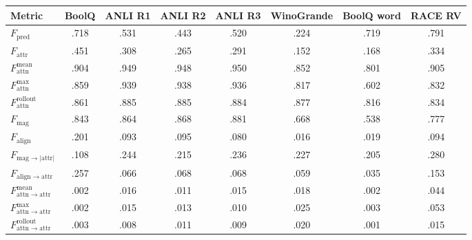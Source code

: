 \begin{tabular}{lccccccc}
\toprule
Metric & BoolQ & ANLI R1 & ANLI R2 & ANLI R3 & WinoGrande & BoolQ word & RACE RV \\
\midrule
$F_{\mathrm{pred}}$ & .718 & .531 & .443 & .520 & .224 & .719 & .791 \\
$F_{\mathrm{attr}}$ & .451 & .308 & .265 & .291 & .152 & .168 & .334 \\
\midrule
$F_{\mathrm{attn}}^{\mathrm{mean}}$ & .904 & .949 & .948 & .950 & .852 & .801 & .905 \\
$F_{\mathrm{attn}}^{\mathrm{max}}$ & .859 & .939 & .938 & .936 & .817 & .602 & .832 \\
$F_{\mathrm{attn}}^{\mathrm{rollout}}$ & .861 & .885 & .885 & .884 & .877 & .816 & .834 \\
$F_{\mathrm{mag}}$ & .843 & .864 & .868 & .881 & .668 & .538 & .777 \\
$F_{\mathrm{align}}$ & .201 & .093 & .095 & .080 & .016 & .019 & .094 \\
\midrule
$F_{\mathrm{mag}\to|\mathrm{attr}|}$ & .108 & .244 & .215 & .236 & .227 & .205 & .280 \\
$F_{\mathrm{align}\to\mathrm{attr}}$ & .257 & .066 & .068 & .068 & .059 & .035 & .153 \\
$F_{\mathrm{attn}\to\mathrm{attr}}^{\mathrm{mean}}$ & .002 & .016 & .011 & .015 & .018 & .002 & .044 \\
$F_{\mathrm{attn}\to\mathrm{attr}}^{\mathrm{max}}$ & .002 & .015 & .013 & .010 & .025 & .003 & .053 \\
$F_{\mathrm{attn}\to\mathrm{attr}}^{\mathrm{rollout}}$ & .003 & .008 & .011 & .009 & .020 & .001 & .015 \\
\bottomrule
\end{tabular}

